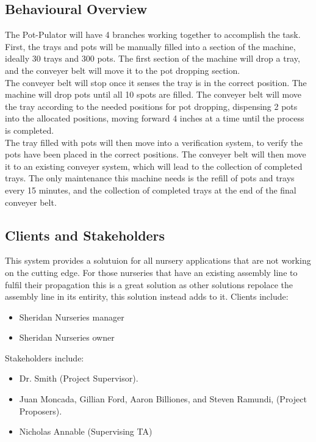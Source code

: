 \documentclass[12pt]{article}
\begin{document}
\subsection{Behavioural Overview}
The Pot-Pulator will have 4 branches working together to accomplish the task. First, the trays and pots will be manually filled into a section of the machine, ideally 30 trays and 300 pots. The first section of the machine will drop a tray, and the conveyer belt will move it to the pot dropping section. \\

\noindent The conveyer belt will stop once it senses the tray is in the correct position. The machine will drop pots until all 10 spots are filled. The conveyer belt will move the tray according to the needed positions for pot dropping, dispensing 2 pots into the allocated positions, moving forward 4 inches at a time until the process is completed. \\

\noindent The tray filled with pots will then move into a verification system, to verify the pots have been placed in the correct positions. The conveyer belt will then move it to an existing conveyer system, which will lead to the collection of completed trays. The only maintenance this machine needs is the refill of pots and trays every 15 minutes, and the collection of completed trays at the end of the final conveyer belt. \\

\subsection{Clients and Stakeholders}
\noindent This system provides a solutuion for all nursery applications that are not working on the cutting edge. For those nurseries that have an existing assembly line to fulfil their propagation this is a great solution as other solutions repolace the assembly line in its entirity, this solution instead adds to it.
\noindent Clients include:
\begin{itemize}
    \item Sheridan Nurseries manager
    \item Sheridan Nurseries owner
\end{itemize}
\noindent Stakeholders include:
\begin{itemize}
    \item Dr. Smith (Project Supervisor).
    \item Juan Moncada, Gillian Ford, Aaron Billiones, and Steven Ramundi, (Project Proposers).
    \item Nicholas Annable (Supervising TA)
    
\end{itemize}
\end{document}
